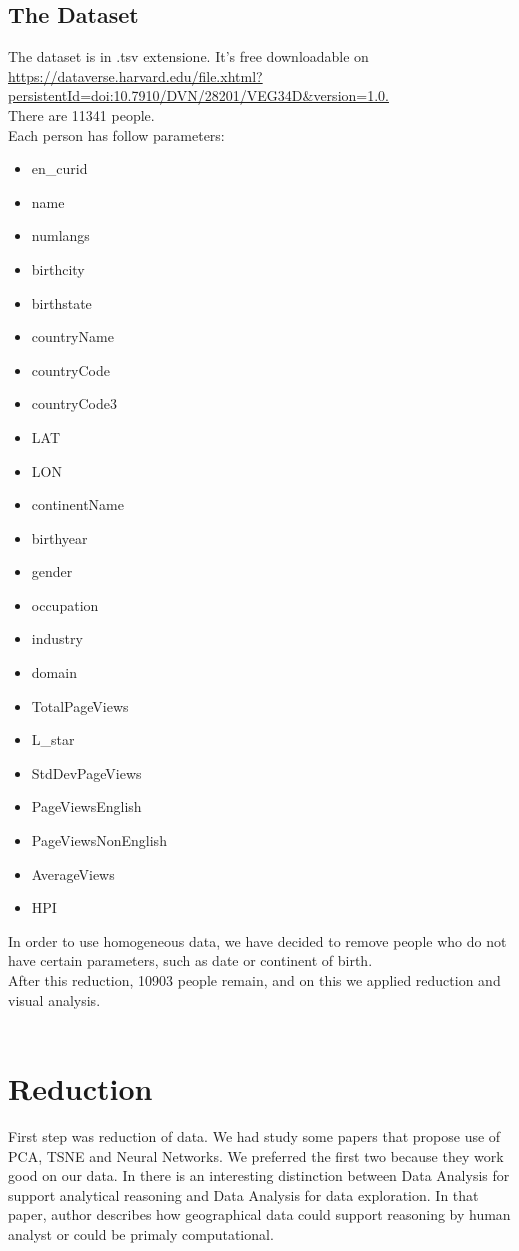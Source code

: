 \documentclass[12pt]{article}
\begin{document}
\subsection{The Dataset}
The dataset is in .tsv extensione. It's free downloadable on \\
\url{https://dataverse.harvard.edu/file.xhtml?persistentId=doi:10.7910/DVN/28201/VEG34D&version=1.0.}\\
There are 11341 people.\\
Each person has follow parameters:\\
\begin{multicols}{3}
\begin{itemize}
\item en\_curid
\item name
\item numlangs
\item birthcity
\item birthstate
\item countryName
\item countryCode
\item countryCode3
\item LAT
\item LON
\item continentName
\item birthyear
\item gender
\item occupation
\item industry
\item domain
\item TotalPageViews
\item L\_star
\item StdDevPageViews
\item PageViewsEnglish
\item PageViewsNonEnglish
\item AverageViews
\item HPI
\end{itemize}
\end{multicols}
In order to use homogeneous data, we have decided to remove people who do not 
have certain parameters, 
such as date or continent of birth.\\
After this reduction, 10903 people remain, and
on this we applied reduction and visual analysis. \\\\

\section{Reduction}
First step was reduction of data. We had study some papers that propose use of PCA, TSNE and Neural Networks. We preferred the first two because they work good on our data.
In \cite{Andrienko} there is an interesting distinction between Data Analysis for support analytical reasoning and Data Analysis for data exploration. In that paper, author describes how geographical data could support reasoning by human analyst or could be primaly computational.\\

\nocite{*}


\end{document}
